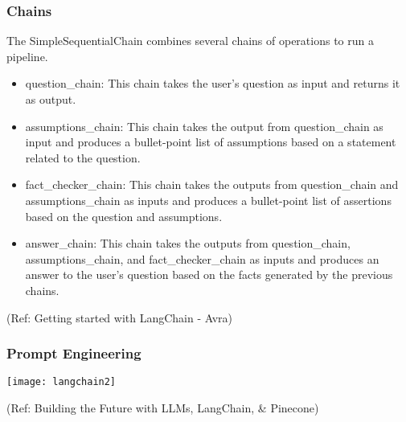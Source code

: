 \begin{frame}\frametitle{Chains}

The SimpleSequentialChain combines several chains of operations to run a pipeline. 

\begin{itemize}
\item question\_chain: This chain takes the user's question as input and returns it as output. 
\item assumptions\_chain: This chain takes the output from question\_chain as input and produces a bullet-point list of assumptions based on a statement related to the question. 
\item fact\_checker\_chain: This chain takes the outputs from question\_chain and assumptions\_chain as inputs and produces a bullet-point list of assertions based on the question and assumptions.
\item answer\_chain: This chain takes the outputs from question\_chain, assumptions\_chain, and fact\_checker\_chain as inputs and produces an answer to the user's question based on the facts generated by the previous chains.
\end{itemize}


{\tiny (Ref: Getting started with LangChain - Avra)}
\end{frame}


\begin{frame}\frametitle{Prompt Engineering}

\begin{center}
\texttt{[image: langchain2]}
\end{center}	  

{\tiny (Ref: Building the Future with LLMs, LangChain, \& Pinecone)}
\end{frame}
